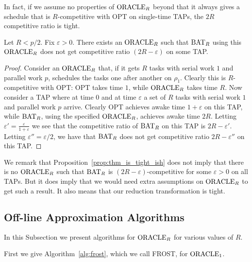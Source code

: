 In fact, if we assume no properties of $\operatorname{\text{ORACLE}}_R$ beyond that it
always gives a schedule that is $R$-competitive with OPT on
single-time TAPs, the $2R$ competitive ratio is tight.
\begin{proposition}
  \label{prop:thm_is_tight_ish}
  Let $R < p/2$. Fix $\varepsilon > 0$.
  There exists an $\operatorname{\text{ORACLE}}_R$ such that $\operatorname{\text{BAT}}_R$ using this
  $\operatorname{\text{ORACLE}}_R$ does not get competitive ratio $(2R-\varepsilon)$
  on some TAP.
\end{proposition}
\begin{proof}
  Consider an $\operatorname{\text{ORACLE}}_R$ that, if it gets $R$ tasks with serial
  work $1$ and parallel work $p$, schedules the tasks one after
  another on $\rho_1$. Clearly this is $R$-competitive with OPT:
  OPT takes time $1$, while $\operatorname{\text{ORACLE}}_R$ takes time
  $R$. Now consider a TAP where at time $0$ and at time
  $\varepsilon$ a set of $R$ tasks with serial work $1$ and
  parallel work $p$ arrive. Clearly OPT achieves awake time
  $1+\varepsilon$ on this TAP, while $\operatorname{\text{BAT}}_R$, using the
  specified $\operatorname{\text{ORACLE}}_R$, achieves awake time $2R$.
  Letting $\varepsilon' = \frac{\varepsilon}{1+\varepsilon}$ we
  see that the competitive ratio of $\operatorname{\text{BAT}}_R$ on this TAP is
  $2R-\varepsilon'$. Letting $\varepsilon'' = \varepsilon/2$, we
  have that $\operatorname{\text{BAT}}_R$ does not get competitive ratio
  $2R-\varepsilon''$ on this TAP.
\end{proof}
We remark that Proposition~\ref{prop:thm_is_tight_ish} does not
imply that there is no $\operatorname{\text{ORACLE}}_R$ such that $\operatorname{\text{BAT}}_R$ is
$(2R-\varepsilon)$-competitive for some $\varepsilon > 0$ on all
TAPs. But it does imply that we would need extra assumptions on
$\operatorname{\text{ORACLE}}_R$ to get such a result. It also means that our
reduction transformation is tight.

\subsection{Off-line Approximation Algorithms}
\label{subsec:offlineawaketime}
In this Subsection we present algorithms for $\operatorname{\text{ORACLE}}_R$ for
various values of $R$.

First we give Algorithm~\ref{alg:frost}, which we call
FROST, for $\operatorname{\text{ORACLE}}_1$. 


